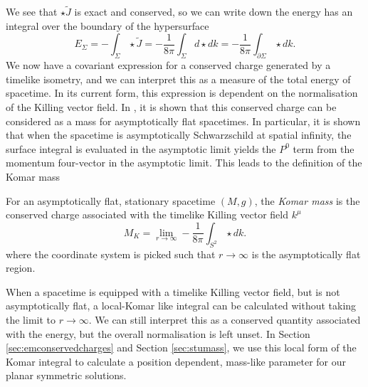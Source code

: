 We see that $\star \tilde{J}$ is exact and conserved, so we can write down the energy has an integral over the boundary of the hypersurface
\begin{equation}
\label{eq:komarenergy}
	E_\Sigma = - \int_\Sigma \star \tilde{J} = - \frac{1}{8\pi} \int_\Sigma d \star dk = - \frac{1}{8\pi} \int_{\partial \Sigma} \star dk .  
\end{equation}
We now have a covariant expression for a conserved charge generated by a timelike isometry, and we can interpret this as a measure of the total energy of spacetime. In its current form, this expression is dependent on the normalisation of the Killing vector field. In \cite{Komar:1958wp}, it is shown that this conserved charge can be considered as a mass for asymptotically flat spacetimes. In particular, it is shown that when the spacetime is asymptotically Schwarzschild at spatial infinity, the surface integral is evaluated in the asymptotic limit yields the $P^0$ term from the momentum four-vector in the asymptotic limit. This leads to the definition of the Komar mass

	\begin{defn}
	For an asymptotically flat, stationary spacetime $(M,g)$, the \emph{Komar mass} is the conserved charge associated with the timelike Killing vector field $k^\mu$
		\begin{equation}
		\label{eq:komarmass}
		    M_K = \lim_{r \rightarrow \infty} -\frac{1}{8 \pi} \int_{S^2} \star d k.
		\end{equation}	
		where the coordinate system is picked such that $r \rightarrow \infty$ is the asymptotically flat region. 
	\end{defn}

When a spacetime is equipped with a timelike Killing vector field, but is not asymptotically flat, a local-Komar like integral can be calculated without taking the limit to $r \rightarrow \infty$. We can still interpret this as a conserved quantity associated with the energy, but the overall normalisation is left unset. In Section \ref{sec:emconservedcharges} and Section \ref{sec:stumass}, we use this local form of the Komar integral to calculate a position dependent, mass-like parameter for our planar symmetric solutions.

